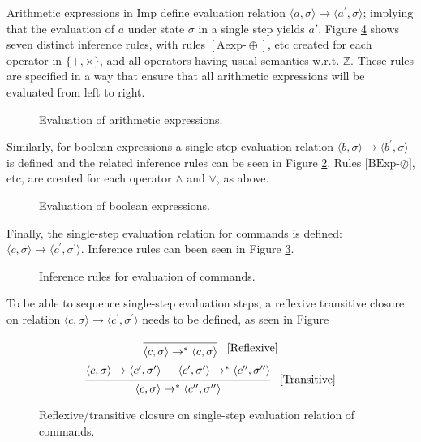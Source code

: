 Arithmetic expressions in Imp define evaluation relation $\langle a, \sigma \rangle \rightarrow \langle a^\prime, \sigma  \rangle$; implying that the evaluation of $a$ under state $\sigma$ in a single step yields $a\prime$. Figure \ref{infer-arith} shows seven distinct inference rules, with rules $[\text{Aexp-}\oplus]$, etc created for each operator in $\{+, \times \}$, and all operators having usual semantics w.r.t. $\mathbb{Z}$. These rules are specified in a way that ensure that all arithmetic expressions will be evaluated from left to right.

\begin{figure}[h]

\caption{Evaluation of arithmetic expressions.}
\label{infer-arith}
\end{figure}

Similarly, for boolean expressions a single-step evaluation relation $\langle b, \sigma \rangle \rightarrow \langle b^\prime, \sigma  \rangle$ is defined and the related inference rules can be seen in Figure \ref{infer-bool}. Rules [$\text{BExp-}\oslash]$, etc, are created for each operator $\land$ and $\lor$, as above.

\begin{figure}[h]

\caption{Evaluation of boolean expressions.}
\label{infer-bool}
\end{figure}

Finally, the single-step evaluation relation for commands is defined: $\langle c, \sigma \rangle \rightarrow \langle c^\prime, \sigma^\prime \rangle$. Inference rules can been seen in Figure \ref{infer-comm}.

\begin{figure}[h]

\caption{Inference rules for evaluation of commands.}
\label{infer-comm}
\end{figure}

To be able to sequence single-step evaluation steps, a reflexive transitive closure on relation $\langle c, \sigma \rangle \rightarrow \langle c^\prime, \sigma^\prime \rangle$ needs to be defined, as seen in Figure

\begin{figure}[h]
\[
\begin{prooftree}
\infer0{
	\langle c, \sigma \rangle
	\rightarrow^{*} \langle
	c, \sigma \rangle
}
\end{prooftree} \; \; \; [\text{Reflexive}]
\]
\[
\begin{prooftree}
\hypo{
	\langle c, \sigma \rangle \rightarrow \langle c^\prime, \sigma^\prime \rangle
}
\hypo{
	\langle c^\prime, \sigma^\prime \rangle \rightarrow^{*} \langle c^{\prime\prime}, \sigma^{\prime\prime} \rangle
}
\infer2{
	\langle c, \sigma \rangle \rightarrow^{*} \langle c^{\prime\prime}, \sigma^{\prime\prime} \rangle
}
\end{prooftree} \; \; \; [\text{Transitive}]
\]

\caption{Reflexive/transitive closure on single-step evaluation relation of commands.}
\label{infer-arith}
\end{figure}


